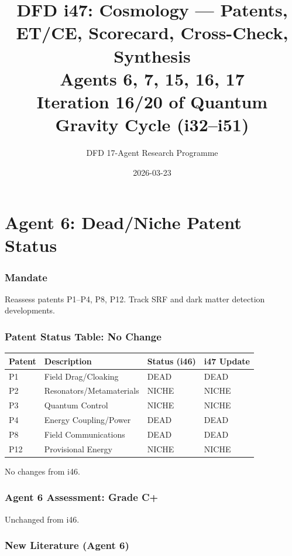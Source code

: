 \documentclass[11pt,a4paper]{article}
\title{DFD i47: Cosmology --- Patents, ET/CE, Scorecard, Cross-Check, Synthesis\\[6pt]
\large Agents 6, 7, 15, 16, 17\\[6pt]
\normalsize Iteration 16/20 of Quantum Gravity Cycle (i32--i51)}
\author{DFD 17-Agent Research Programme}
\date{2026-03-23}
\begin{document}
\maketitle
\tableofcontents
\newpage

\part{Agent 6: Dead/Niche Patent Status}
\label{part:agent6}

\section{Mandate}

Reassess patents P1--P4, P8, P12. Track SRF and dark matter detection developments.

\section{Patent Status Table: No Change}

\begin{center}
\begin{tabular}{llll}
\toprule
\textbf{Patent} & \textbf{Description} & \textbf{Status (i46)} & \textbf{i47 Update} \\
\midrule
P1 & Field Drag/Cloaking & DEAD & DEAD \\
P2 & Resonators/Metamaterials & NICHE & NICHE \\
P3 & Quantum Control & NICHE & NICHE \\
P4 & Energy Coupling/Power & DEAD & DEAD \\
P8 & Field Communications & DEAD & DEAD \\
P12 & Provisional Energy & NICHE & NICHE \\
\bottomrule
\end{tabular}
\end{center}

No changes from i46.

\section{Agent 6 Assessment: Grade C+}

Unchanged from i46.

\section{New Literature (Agent 6)}
\end{document}
